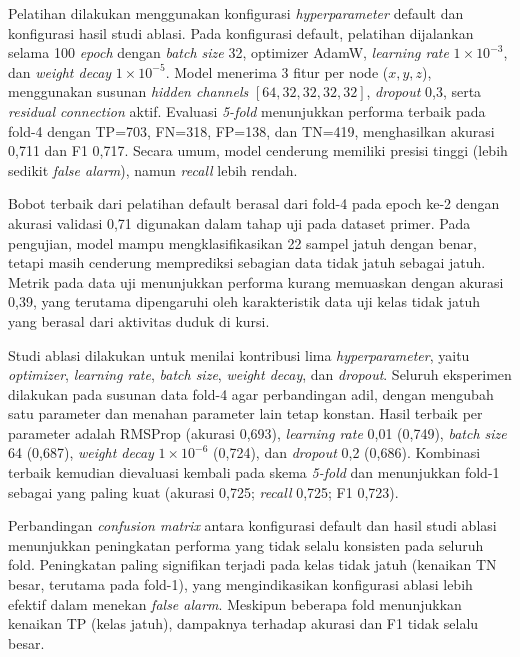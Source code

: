 Pelatihan dilakukan menggunakan konfigurasi \textit{hyperparameter} default dan konfigurasi hasil studi ablasi. Pada konfigurasi default, pelatihan dijalankan selama 100 \textit{epoch} dengan \textit{batch size} 32, optimizer AdamW, \textit{learning rate} \(1\times 10^{-3}\), dan \textit{weight decay} \(1\times 10^{-5}\). Model menerima 3 fitur per node (\(x,y,z\)), menggunakan susunan \textit{hidden channels} \([64,32,32,32,32]\), \textit{dropout} 0,3, serta \textit{residual connection} aktif. Evaluasi \textit{5-fold} menunjukkan performa terbaik pada fold-4 dengan TP=703, FN=318, FP=138, dan TN=419, menghasilkan akurasi 0,711 dan F1 0,717. Secara umum, model cenderung memiliki presisi tinggi (lebih sedikit \textit{false alarm}), namun \textit{recall} lebih rendah. \par

Bobot terbaik dari pelatihan default berasal dari fold-4 pada epoch ke-2 dengan akurasi validasi 0,71 digunakan dalam tahap uji pada dataset primer. Pada pengujian, model mampu mengklasifikasikan 22 sampel jatuh dengan benar, tetapi masih cenderung memprediksi sebagian data tidak jatuh sebagai jatuh. Metrik pada data uji menunjukkan performa kurang memuaskan dengan akurasi 0,39, yang terutama dipengaruhi oleh karakteristik data uji kelas tidak jatuh yang berasal dari aktivitas duduk di kursi. \par

Studi ablasi dilakukan untuk menilai kontribusi lima \textit{hyperparameter}, yaitu \textit{optimizer}, \textit{learning rate}, \textit{batch size}, \textit{weight decay}, dan \textit{dropout}. Seluruh eksperimen dilakukan pada susunan data fold-4 agar perbandingan adil, dengan mengubah satu parameter dan menahan parameter lain tetap konstan. Hasil terbaik per parameter adalah RMSProp (akurasi 0,693), \textit{learning rate} 0,01 (0,749), \textit{batch size} 64 (0,687), \textit{weight decay} \(1\times 10^{-6}\) (0,724), dan \textit{dropout} 0,2 (0,686). Kombinasi terbaik kemudian dievaluasi kembali pada skema \textit{5-fold} dan menunjukkan fold-1 sebagai yang paling kuat (akurasi 0,725; \textit{recall} 0,725; F1 0,723). \par

Perbandingan \textit{confusion matrix} antara konfigurasi default dan hasil studi ablasi menunjukkan peningkatan performa yang tidak selalu konsisten pada seluruh fold. Peningkatan paling signifikan terjadi pada kelas tidak jatuh (kenaikan TN besar, terutama pada fold-1), yang mengindikasikan konfigurasi ablasi lebih efektif dalam menekan \textit{false alarm}. Meskipun beberapa fold menunjukkan kenaikan TP (kelas jatuh), dampaknya terhadap akurasi dan F1 tidak selalu besar. \par

